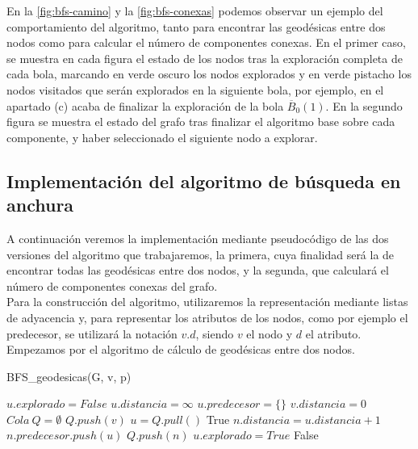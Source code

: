 En la \autoref{fig:bfs-camino} y la \autoref{fig:bfs-conexas} podemos observar un ejemplo del comportamiento del algoritmo, tanto para encontrar las geodésicas entre dos nodos como para calcular el número de componentes conexas. En el primer caso, se muestra en cada figura el estado de los nodos tras la exploración completa de cada bola, marcando en verde oscuro los nodos explorados y en verde pistacho los nodos visitados que serán explorados en la siguiente bola, por ejemplo, en el apartado (c) acaba de finalizar la exploración de la bola $\overline B_0(1)$. En la segundo figura se muestra el estado del grafo tras finalizar el algoritmo base sobre cada componente, y haber seleccionado el siguiente nodo a explorar.


\subsection{Implementación del algoritmo de búsqueda en anchura}
A continuación veremos la implementación mediante pseudocódigo de las dos versiones del algoritmo que trabajaremos, la primera, cuya finalidad será la de encontrar todas las geodésicas entre dos nodos, y la segunda, que calculará el número de componentes conexas del grafo. \\

Para la construcción del algoritmo, utilizaremos la representación mediante listas de adyacencia y, para representar los atributos de los nodos, como por ejemplo el predecesor, se utilizará la notación $v.d$, siendo $v$ el nodo y $d$ el atributo. \\

Empezamos por el algoritmo de cálculo de geodésicas entre dos nodos.

\begin{algorithm}
	\caption{BFS\_geodesicas(G, v, p)}
	\begin{algorithmic}[1]
			\State $u.explorado = False$
			\State $u.distancia = \infty$
			\State $u.predecesor = \{\}$
		\EndFor
		\State $v.distancia = 0$
		\State $Cola\ Q = \emptyset$
		\State $Q.push(v)$
			\State $u = Q.pull()$
				\Return True
			\EndIf
						\State $n.distancia = u.distancia + 1$
						\State $n.predecesor.push(u)$
						\State $Q.push(n)$
					\EndIf
				\EndIf
			\EndFor
			\State $u.explorado = True$
		\EndWhile
		\Return False
	\end{algorithmic}
\end{algorithm}

